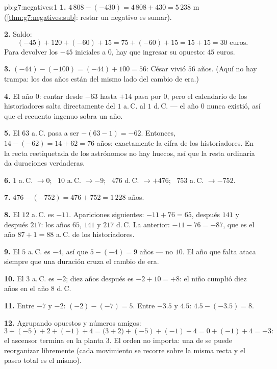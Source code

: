 \begin{solution}{pb:g7:negatives:1}
\textbf{1.} $4\,808 - (-430) = 4\,808 + 430 = 5\,238$ m
(\cref{thm:g7:negatives:sub}: restar un negativo es
sumar).

\textbf{2.} Saldo:
\[
(-45) + 120 + (-60) + 15 = 75 + (-60) + 15 = 15 + 15 = 30
\text{ euros}.
\]
Para devolver los $-45$ iniciales a $0$, hay que ingresar su opuesto:
$45$ euros.

\textbf{3.} $(-44) - (-100) = (-44) + 100 = 56$: César vivió
$56$ años. (Aquí no hay trampa: los dos años están del mismo lado del
cambio de era.)

\textbf{4.} El año $0$: contar desde $-63$ hasta $+14$ pasa
por $0$, pero el calendario de los historiadores salta directamente del
$1$ a.\,C. al $1$ d.\,C. --- el año $0$ nunca existió, así que el recuento
ingenuo sobra un año.

\textbf{5.} El $63$ a.\,C. pasa a ser $-(63 - 1) = -62$. Entonces,
$14 - (-62) = 14 + 62 = 76$ años: exactamente la cifra de los
historiadores. En la recta reetiquetada de los astrónomos no hay huecos,
así que la resta ordinaria da duraciones verdaderas.

\textbf{6.} $1$ a.\,C. $\to 0$; \ $10$ a.\,C. $\to -9$; \ $476$
d.\,C. $\to +476$; \ $753$ a.\,C. $\to -752$.

\textbf{7.} $476 - (-752) = 476 + 752 = 1\,228$ años.

\textbf{8.} El $12$ a.\,C. es $-11$. Apariciones siguientes:
$-11 + 76 = 65$, después $141$ y después $217$: los años $65$, $141$ y
$217$ d.\,C. La anterior: $-11 - 76 = -87$, que es el
año $87 + 1 = 88$ a.\,C. de los historiadores.

\textbf{9.} El $5$ a.\,C. es $-4$, así que $5 - (-4) = 9$ años --- no
$10$. El año  que falta ataca siempre que una duración cruza
el cambio de era.

\textbf{10.} El $3$ a.\,C. es $-2$; diez años después es $-2 + 10 = +8$:
el niño cumplió diez años en el año $8$ d.\,C.

\textbf{11.} Entre $-7$ y $-2$: $(-2) - (-7) = 5$. Entre
$-3.5$ y $4.5$: $4.5 - (-3.5) = 8$.

\textbf{12.} Agrupando opuestos y números amigos:
\[
3 + (-5) + 2 + (-1) + 4
= \bigl(3 + 2\bigr) + (-5) + (-1) + 4
= 0 + (-1) + 4 = +3 :
\]
el ascensor termina en la planta $3$. El orden no importa: una  de
 se puede reorganizar libremente (cada movimiento se recorre
sobre la misma recta y el paseo total es el mismo).


\end{solution}
